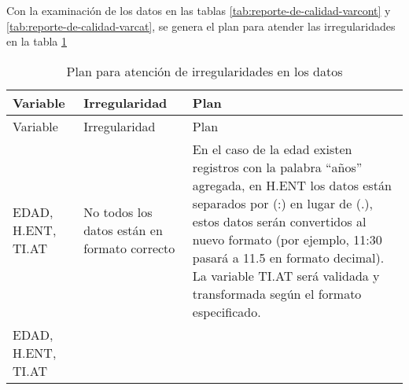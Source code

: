 \documentclass[]{book}
\begin{document}
Con la examinación de los datos en las tablas
\ref{tab:reporte-de-calidad-varcont} y
\ref{tab:reporte-de-calidad-varcat}, se genera el plan para atender las
irregularidades en la tabla \ref{tab:plan-de-atencion-irregularidades}

\begin{longtable}[]{@{}lll@{}}
\caption{\label{tab:plan-de-atencion-irregularidades} Plan para atención de
irregularidades en los datos}\tabularnewline
\toprule
\begin{minipage}[b]{0.05\columnwidth}\raggedright\strut
Variable\strut
\end{minipage} & \begin{minipage}[b]{0.11\columnwidth}\raggedright\strut
Irregularidad\strut
\end{minipage} & \begin{minipage}[b]{0.75\columnwidth}\raggedright\strut
Plan\strut
\end{minipage}\tabularnewline
\midrule
\endfirsthead
\toprule
\begin{minipage}[b]{0.05\columnwidth}\raggedright\strut
Variable\strut
\end{minipage} & \begin{minipage}[b]{0.11\columnwidth}\raggedright\strut
Irregularidad\strut
\end{minipage} & \begin{minipage}[b]{0.75\columnwidth}\raggedright\strut
Plan\strut
\end{minipage}\tabularnewline
\midrule
\endhead
\begin{minipage}[t]{0.05\columnwidth}\raggedright\strut
EDAD, H.ENT, TI.AT\strut
\end{minipage} & \begin{minipage}[t]{0.11\columnwidth}\raggedright\strut
No todos los datos están en formato correcto\strut
\end{minipage} & \begin{minipage}[t]{0.75\columnwidth}\raggedright\strut
En el caso de la edad existen registros con la palabra ``años''
agregada, en H.ENT los datos están separados por (:) en lugar de (.),
estos datos serán convertidos al nuevo formato (por ejemplo, 11:30
pasará a 11.5 en formato decimal). La variable TI.AT será validada y
transformada según el formato especificado.\strut
\end{minipage}\tabularnewline
\begin{minipage}[t]{0.05\columnwidth}\raggedright\strut
EDAD, H.ENT, TI.AT\strut
\end{minipage} & \begin{minipage}[t]{0.11\columnwidth}\raggedright\strut

\end{minipage}
\end{longtable}
\end{document}
